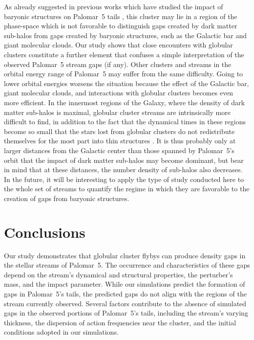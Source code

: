 \documentclass{aa}
\begin{document}
  As already suggested in previous works which have studied the impact of baryonic structures on Palomar~5 tails \citep{2017NatAs...1..633P, 2019MNRAS.484.2009B}, this cluster may lie in a region of the phase-space which is not favorable to distinguish gaps created by dark matter sub-halos from gaps created by baryonic structures, such as the Galactic bar and giant molecular clouds. Our study shows that close encounters with globular clusters constitute a further element that confuses a simple interpretation of the observed Palomar~5 stream gaps (if any). Other clusters and streams in the orbital energy range of Palomar~5 may suffer from the same difficulty. Going to lower orbital energies worsens the situation because the effect of the Galactic bar, giant molecular clouds, and interactions with globular clusters becomes even more efficient. In the innermost regions of the Galaxy, where the density of dark matter sub-halos is maximal, globular cluster streams are intrinsically more difficult to find, in addition to the fact that the dynamical times in these regions become so small that the stars lost from globular clusters do not redistribute themselves for the most part into thin structures \citep[see][]{2023A&A...673A..44F}. It is thus probably only at larger distances from the Galactic center than those spanned by Palomar~5's orbit that the impact of dark matter sub-halos may become dominant, but bear in mind that at these distances, the number density of sub-halos also decreases. In the future, it will be interesting to apply the type of study conducted here to the whole set of streams to quantify the regime in which they are favorable to the creation of gaps from baryonic structures.
  

  
\section{Conclusions}
  Our study demonstrates that globular cluster flybys can produce density gaps in the stellar streams of Palomar~5. The occurrence and characteristics of these gaps depend on the stream's dynamical and structural properties, the perturber's mass, and the impact parameter. While our simulations predict the formation of gaps in Palomar~5's tails, the predicted gaps do not align with the regions of the stream currently observed. Several factors contribute to the absence of simulated gaps in the observed portions of Palomar~5's tails, including the stream's varying thickness, the dispersion of action frequencies near the cluster, and the initial conditions adopted in our simulations. 
\end{document}

